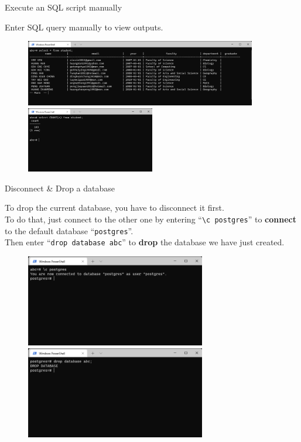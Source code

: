 \begin{frame}[fragile]{Execute an SQL script manually}
	
	Enter SQL query manually to view outputs.
	\begin{figure}
		\includegraphics[width=0.9\textwidth]{t0-psql/images/8.png}\vspace{10pt}
		\includegraphics[width=0.5\textwidth]{t0-psql/images/9.png}
	\end{figure}
	
\end{frame}

\begin{frame}[fragile]{Disconnect \& Drop a database}
	
	To drop the current database, you have to disconnect it first.\\
	To do that, just connect to the other one by entering ``\texttt{\textbackslash c postgres}'' to \textbf{connect} to the default database ``\texttt{postgres}''.\\
	Then enter ``\texttt{drop database abc}'' to \textbf{drop} the database we have just created.
	
	\begin{figure}
		\includegraphics[trim=0 5cm 0 0, clip, width=0.7\textwidth]{t0-psql/images/10.png}\vspace{10pt}
		\includegraphics[trim=0 5cm 0 0, clip, width=0.7\textwidth]{t0-psql/images/11.png}
	\end{figure}
	
\end{frame}

